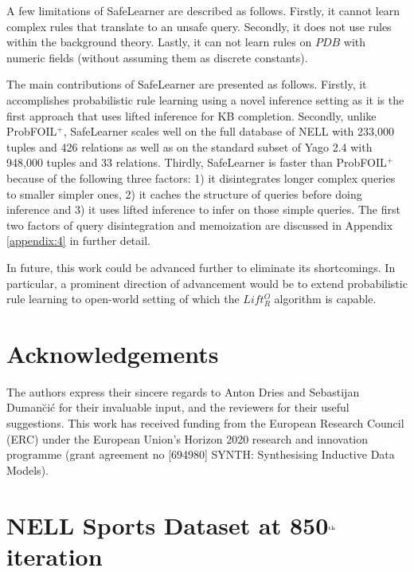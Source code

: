 \documentclass[akbc,twoside,11pt]{article}
\newcommand{\algorithmname}{SafeLearner\xspace}
\begin{document}
A few limitations of \algorithmname are described as follows. Firstly, it cannot learn complex rules that translate to an unsafe query. Secondly, it does not use rules within the background theory. %
Lastly, it can not learn rules on $PDB$ with numeric fields (without assuming them as discrete constants).

The main contributions of \algorithmname are presented as follows. Firstly, it accomplishes probabilistic rule learning using a novel inference setting as it is the first approach that uses lifted inference for KB completion. Secondly, unlike ProbFOIL$^+$, \algorithmname scales well on the full database of NELL with 233,000 tuples and 426 relations as well as on the standard subset of Yago 2.4 with 948,000 tuples and 33 relations. Thirdly, \algorithmname is faster than ProbFOIL$^+$ because of the following three factors: 1) it disintegrates longer complex queries to smaller simpler ones, 2) it caches the structure of queries before doing inference and 3) it uses lifted inference to infer on those simple queries. The first two factors of query disintegration and memoization are discussed in Appendix \ref{appendix:4} in further detail.

In future, this work could be advanced further to eliminate its shortcomings. In particular, a prominent direction of advancement would be to extend probabilistic rule learning to open-world setting of which the $Lift^O_R$ algorithm \cite{DBLP:conf/kr/CeylanDB16} is capable.

\section*{Acknowledgements}
The authors express their sincere regards to Anton Dries and Sebastijan Duman\u{c}i\'c for their invaluable input, and the reviewers for their useful suggestions. This work has received funding from the European Research Council (ERC) under the European Union’s Horizon 2020 research and innovation programme (grant agreement no [694980] SYNTH: Synthesising Inductive Data Models).




\appendix
\section{NELL Sports Dataset at 850$^{\mbox{\tiny th}}$ iteration}\label{appendix:1}
\end{document}

